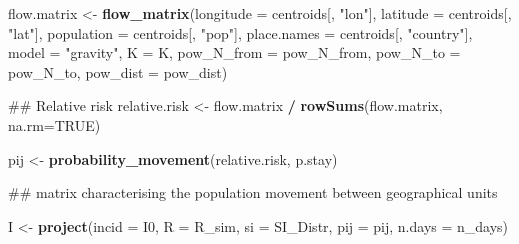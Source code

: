 \documentclass[11pt,]{article}
\newenvironment{Shaded}{\begin{snugshade}}{\end{snugshade}}
\newcommand{\KeywordTok}[1]{\textcolor[rgb]{0.13,0.29,0.53}{\textbf{#1}}}
\newcommand{\DataTypeTok}[1]{\textcolor[rgb]{0.13,0.29,0.53}{#1}}
\newcommand{\StringTok}[1]{\textcolor[rgb]{0.31,0.60,0.02}{#1}}
\newcommand{\OtherTok}[1]{\textcolor[rgb]{0.56,0.35,0.01}{#1}}
\newcommand{\OperatorTok}[1]{\textcolor[rgb]{0.81,0.36,0.00}{\textbf{#1}}}
\newcommand{\NormalTok}[1]{#1}
\begin{document}
\begin{Shaded}
\begin{Highlighting}[]
\NormalTok{flow.matrix <-}\StringTok{ }\KeywordTok{flow_matrix}\NormalTok{(}\DataTypeTok{longitude =}\NormalTok{ centroids[, }\StringTok{"lon"}\NormalTok{],}
                           \DataTypeTok{latitude  =}\NormalTok{ centroids[, }\StringTok{"lat"}\NormalTok{],}
                           \DataTypeTok{population =}\NormalTok{ centroids[, }\StringTok{"pop"}\NormalTok{],}
                           \DataTypeTok{place.names =}\NormalTok{ centroids[, }\StringTok{"country"}\NormalTok{],}
                           \DataTypeTok{model =} \StringTok{"gravity"}\NormalTok{,}
                           \DataTypeTok{K =}\NormalTok{ K, }\DataTypeTok{pow_N_from =}\NormalTok{ pow_N_from,}
                           \DataTypeTok{pow_N_to =}\NormalTok{ pow_N_to, }\DataTypeTok{pow_dist =}\NormalTok{ pow_dist)}


\NormalTok{## Relative risk}
\NormalTok{relative.risk <-}\StringTok{ }\NormalTok{flow.matrix }\OperatorTok{/}\StringTok{ }\KeywordTok{rowSums}\NormalTok{(flow.matrix, }\DataTypeTok{na.rm=}\OtherTok{TRUE}\NormalTok{)}



\NormalTok{pij <-}\StringTok{ }\KeywordTok{probability_movement}\NormalTok{(relative.risk, p.stay)}
\end{Highlighting}
\end{Shaded}

\begin{Shaded}
\begin{Highlighting}[]
\NormalTok{## matrix characterising the population movement between geographical units}

\NormalTok{I <-}\StringTok{ }\KeywordTok{project}\NormalTok{(}\DataTypeTok{incid =}\NormalTok{ I0, }\DataTypeTok{R =}\NormalTok{ R_sim, }\DataTypeTok{si =}\NormalTok{ SI_Distr,}
              \DataTypeTok{pij =}\NormalTok{ pij,}
              \DataTypeTok{n.days =}\NormalTok{ n_days)}
\end{Highlighting}
\end{Shaded}
\end{document}
